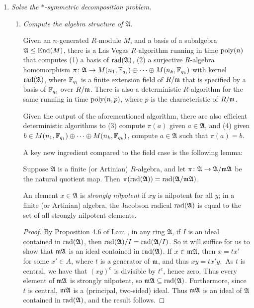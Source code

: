 \begin{enumerate}
\item \textit{Solve the $*$-symmetric decomposition problem.}

\begin{enumerate}
\item \textit{Compute the algebra structure of $\mathfrak{A}$.} 

\begin{theorem} \label{thm:structure}
Given an $n$-generated  $R$-module $M$, and a basis of a subalgebra $\mathfrak{A} \leq \mathrm{End}(M)$, there is a Las Vegas $R$-algorithm running in time $\mathrm{poly}(n)$ that computes (1) a basis of $\mathrm{rad}(\mathfrak{A})$, (2) a surjective $R$-algebra homomorphism $\pi \colon \mathfrak{A} \to M(n_1, \mathbb{F}_{q_1}) \oplus \dotsb \oplus M(n_k, \mathbb{F}_{q_k})$ with kernel $\mathrm{rad}(\mathfrak{A})$, where $\mathbb{F}_{q_i}$ is a finite extension field of $R/\mathfrak{m}$ that is specified by a basis of $\mathbb{F}_{q_i}$ over $R/\mathfrak{m}$. There is also a deterministic $R$-algorithm for the same running in time $\mathrm{poly}(n, p)$, where $p$ is the characteristic of $R/\mathfrak{m}$.

Given the output of the aforementioned algorithm, there are also efficient deterministic algorithms to (3) compute $\pi(a)$ given $a \in \mathfrak{A}$, and (4) given $b \in M(n_1, \mathbb{F}_{q_1}) \oplus \dotsb \oplus M(n_k, \mathbb{F}_{q_k})$, compute $a \in \mathfrak{A}$ such that $\pi(a) = b$.
\end{theorem}

A key new ingredient compared to the field case is the following lemma:

\begin{lemma} \label{lem:rad}
Suppose $\mathfrak{A}$ is a finite (or Artinian) $R$-algebra, and let $\pi \colon \mathfrak{A} \to \mathfrak{A} / \mathfrak{m} \mathfrak{A}$ be the natural quotient map. Then $\pi(\mathrm{rad}(\mathfrak{A})) = \mathrm{rad}(\mathfrak{A}/\mathfrak{m} \mathfrak{A})$.
\end{lemma}

An element $x \in \mathfrak{A}$ is \emph{strongly nilpotent} if $xy$ is nilpotent for all $y$; in a finite (or Artinian) algebra, the Jacobson radical $\mathrm{rad}(\mathfrak{A})$ is equal to the set of all strongly nilpotent elements.

\begin{proof}
By Proposition 4.6 of Lam \cite{Lam}, in any ring $\mathfrak{A}$, if $I$ is an ideal contained in $\mathrm{rad}(\mathfrak{A})$, then $\mathrm{rad}(\mathfrak{A})/I = \mathrm{rad}(\mathfrak{A}/I)$. So it will suffice for us to show that $\mathfrak{m} \mathfrak{A}$ is an ideal contained in $\mathrm{rad}(\mathfrak{A})$. If $x \in\mathfrak{m} \mathfrak{A}$,%
then $x=tx'$ for some $x' \in A$, where $t$ is a generator of $\mathfrak{m}$, and thus $xy=tx'y$. As $t$ is central, we have that $(xy)^e$ is divisible by $t^e$, hence zero. Thus every element of $\mathfrak{m} \mathfrak{A}$ is strongly nilpotent, so $\mathfrak{m} \mathfrak{A} \subseteq \mathrm{rad}(\mathfrak{A})$. Furthermore, since $t$ is central, $\mathfrak{m} \mathfrak{A}$ is a (principal, two-sided) ideal. Thus $\mathfrak{m} \mathfrak{A}$ is an ideal of $\mathfrak{A}$ contained in $\mathrm{rad}(\mathfrak{A})$, and the result follows.
\end{proof}


\end{enumerate}
\end{enumerate}
